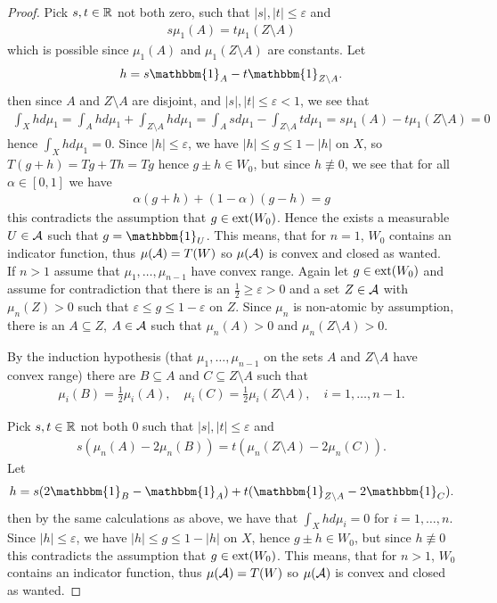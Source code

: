 \begin{proof}
Pick $s,t\in \mathbb{R}$ not both zero, such that $|s|,|t| \le \varepsilon$ and
\begin{align*}
	s\mu_{1}(A) = t\mu_{1}(Z\setminus A)
\end{align*}
which is possible since $\mu_{1}(A)$ and $\mu_{1}(Z\setminus A)$ are constants. Let
\begin{align*}
	h=s\mathbbm{1}_{A} - t\mathbbm{1}_{Z\setminus A}.
\end{align*}
then since $A$ and $Z\setminus A$ are disjoint, and $|s|,|t|\le \varepsilon < 1$, we see that
\begin{align*}
	\int_{X}hd\mu_{1}=\int_{A}hd\mu_{1} + \int_{Z\setminus A}hd\mu_{1}=\int_{A}sd\mu_{1}-\int_{Z\setminus A}td\mu_{1}=s\mu_{1}(A) - t\mu_{1}(Z\setminus A)=0
\end{align*}
hence $\int_{X} h d\mu_{1}=0$. Since $|h|\le \varepsilon$, we have $|h|\le g \le 1-|h|$ on $X$, so $T(g+h)=Tg+Th=Tg$ hence $g\pm h \in W_{0}$, but since $h\not\equiv 0$, we see that for all $\alpha\in [0,1]$ we have
\begin{align*}
	\alpha(g+h)+ (1-\alpha)(g-h)=g
\end{align*}
this contradicts the assumption that $g\in \operatorname{ext}(W_{0})$. Hence the exists a measurable $U\in \mathcal{A}$ such that $g=\mathbbm{1}_{U}$. This means, that for $n=1$, $W_{0}$ contains an indicator function, thus $\mu(\mathcal{A})=T(W)$ so $\mu(\mathcal{A})$ is convex and closed as wanted. \\

If $n > 1$ assume that $\mu_{1}, \dots, \mu_{n-1}$ have convex range. Again let $g\in \operatorname{ext}(W_{0})$ and assume for contradiction that there is an $\frac{1}{2} \ge \varepsilon > 0$ and a set $Z\in \mathcal{A}$ with $\mu_{n}(Z)>0$ such that $\varepsilon \le g \le 1-\varepsilon$ on $Z$. Since $\mu_{n}$ is non-atomic by assumption, there is an $A\subseteq Z$, $A\in \mathcal{A}$ such that $\mu_{n}(A)>0$ and $\mu_{n}(Z\setminus A)>0$.

By the induction hypothesis (that $\mu_{1}, \dots, \mu_{n-1}$ on the sets $A$ and $Z\setminus A$ have convex range) there are $B\subseteq A$ and $C\subseteq Z\setminus A$ such that
\begin{align*}
	\mu_{i}(B)=\frac{1}{2}\mu_{i}(A), \quad \mu_{i}(C)=\frac{1}{2}\mu_{i}(Z\setminus A), \quad i=1, \dots, n-1.
\end{align*}

Pick $s,t\in \mathbb{R}$ not both $0$ such that $|s|,|t|\le \varepsilon$ and
\begin{align*}
	s(\mu_{n}(A) - 2\mu_{n}(B)) = t(\mu_{n}(Z\setminus A) - 2\mu_{n}(C)).
\end{align*}
Let
\begin{align*}
	h=s(2\mathbbm{1}_{B}-\mathbbm{1}_{A}) + t(\mathbbm{1}_{Z\setminus A} - 2\mathbbm{1}_{C}).
\end{align*}
then by the same calculations as above, we have that $\int_{X} h d\mu_{i}=0$ for $i=1, \dots, n$. Since $|h|\le \varepsilon$, we have $|h|\le g \le 1-|h|$ on $X$, hence $g\pm h \in W_{0}$, but since $h\not\equiv 0$ this contradicts the assumption that $g\in \operatorname{ext}(W_{0})$. This means, that for $n > 1$, $W_{0}$ contains an indicator function, thus $\mu(\mathcal{A})=T(W)$ so $\mu(\mathcal{A})$ is convex and closed as wanted.


\end{proof}
